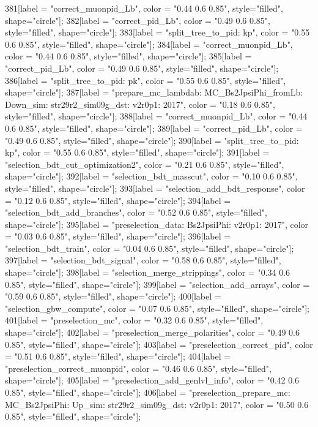 {	381[label = "correct_muonpid_Lb", color = "0.44 0.6 0.85", style="filled", shape="circle"];
	382[label = "correct_pid_Lb", color = "0.49 0.6 0.85", style="filled", shape="circle"];
	383[label = "split_tree_to_pid\npkkp: kp", color = "0.55 0.6 0.85", style="filled", shape="circle"];
	384[label = "correct_muonpid_Lb", color = "0.44 0.6 0.85", style="filled", shape="circle"];
	385[label = "correct_pid_Lb", color = "0.49 0.6 0.85", style="filled", shape="circle"];
	386[label = "split_tree_to_pid\npkkp: pk", color = "0.55 0.6 0.85", style="filled", shape="circle"];
	387[label = "prepare_mc_lambdab\nmode: MC_Bs2JpsiPhi_fromLb\npolarity: Down\nstrip_sim: str29r2_sim09g_dst\nversion: v2r0p1\nyear: 2017", color = "0.18 0.6 0.85", style="filled", shape="circle"];
	388[label = "correct_muonpid_Lb", color = "0.44 0.6 0.85", style="filled", shape="circle"];
	389[label = "correct_pid_Lb", color = "0.49 0.6 0.85", style="filled", shape="circle"];
	390[label = "split_tree_to_pid\npkkp: kp", color = "0.55 0.6 0.85", style="filled", shape="circle"];
	391[label = "selection_bdt_cut_optimization2", color = "0.21 0.6 0.85", style="filled", shape="circle"];
	392[label = "selection_bdt_masscut", color = "0.10 0.6 0.85", style="filled", shape="circle"];
	393[label = "selection_add_bdt_response", color = "0.12 0.6 0.85", style="filled", shape="circle"];
	394[label = "selection_bdt_add_branches", color = "0.52 0.6 0.85", style="filled", shape="circle"];
	395[label = "preselection_data\nmode: Bs2JpsiPhi\nversion: v2r0p1\nyear: 2017", color = "0.03 0.6 0.85", style="filled", shape="circle"];
	396[label = "selection_bdt_train", color = "0.04 0.6 0.85", style="filled", shape="circle"];
	397[label = "selection_bdt_signal", color = "0.58 0.6 0.85", style="filled", shape="circle"];
	398[label = "selection_merge_strippings", color = "0.34 0.6 0.85", style="filled", shape="circle"];
	399[label = "selection_add_arrays", color = "0.59 0.6 0.85", style="filled", shape="circle"];
	400[label = "selection_gbw_compute", color = "0.07 0.6 0.85", style="filled", shape="circle"];
	401[label = "preselection_mc", color = "0.32 0.6 0.85", style="filled", shape="circle"];
	402[label = "preselection_merge_polarities", color = "0.49 0.6 0.85", style="filled", shape="circle"];
	403[label = "preselection_correct_pid", color = "0.51 0.6 0.85", style="filled", shape="circle"];
	404[label = "preselection_correct_muonpid", color = "0.46 0.6 0.85", style="filled", shape="circle"];
	405[label = "preselection_add_genlvl_info", color = "0.42 0.6 0.85", style="filled", shape="circle"];
	406[label = "preselection_prepare_mc\nmode: MC_Bs2JpsiPhi\npolarity: Up\nstrip_sim: str29r2_sim09g_dst\nversion: v2r0p1\nyear: 2017", color = "0.50 0.6 0.85", style="filled", shape="circle"];
}
